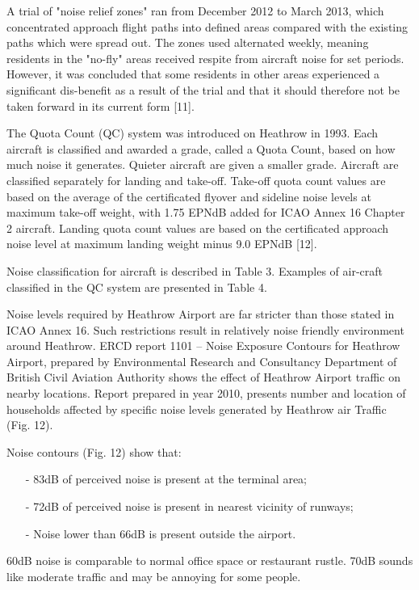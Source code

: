 A trial of "noise relief zones" ran from December 2012 to March 2013, which concentrated approach flight paths into defined areas compared with the existing paths which were spread out. The zones used alternated weekly, meaning residents in the "no-fly" areas received respite from aircraft noise for set periods. However, it was concluded that some residents in other areas experienced a significant dis-benefit as a result of the trial and that it should therefore not be taken forward in its current form [11].

The Quota Count (QC) system was introduced on Heathrow in 1993. Each aircraft is classified and awarded a grade, called a Quota Count, based on how much noise it generates. Quieter aircraft are given a smaller grade.  Aircraft are classified separately for landing and take-off. Take-off quota count values are based on the average of the certificated flyover and sideline noise levels at maximum take-off weight, with 1.75 EPNdB added for ICAO Annex 16 Chapter 2 aircraft. Landing quota count values are based on the certificated approach noise level at maximum landing weight minus 9.0 EPNdB [12].

Noise classification for aircraft is described in Table 3. Examples of air-craft classified in the QC system are presented in Table 4.

Noise levels required by Heathrow Airport are far stricter than those stated in ICAO Annex 16. Such restrictions result in relatively noise friendly environment around Heathrow. ERCD report 1101 – Noise Exposure Contours for Heathrow Airport, prepared by Environmental Research and Consultancy Department of British Civil Aviation Authority shows the effect of Heathrow Airport traffic on nearby locations. Report prepared in year 2010, presents number and location of households affected by specific noise levels generated by Heathrow air Traffic (Fig. 12).

Noise contours (Fig. 12) show that:
\begin{itemize}
\item[-] 83dB of perceived noise is present at the terminal area;
\item[-] 72dB of perceived noise is present in nearest vicinity of runways;
\item[-] Noise lower than 66dB is present outside the airport.
\end{itemize}

60dB noise is comparable to normal office space or restaurant rustle. 70dB sounds like moderate traffic and may be annoying for some people.

